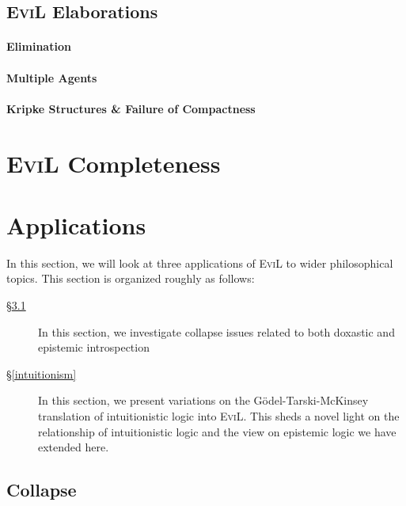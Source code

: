 \documentclass[11pt,titlepage]{report}
\numberwithin{equation}{subsection}
\renewcommand\subsection{\section}
\begin{document}
\subsection{\textsc{EviL} Elaborations}
\label{dead-by-dawn}
\subsubsection{Elimination}
\label{elimination}

\subsubsection{Multiple Agents}\label{multi-agent}

\subsubsection{Kripke Structures \& Failure of Compactness}
\label{kripke} 
\label{non-compactness}

\chapter{\textsc{EviL} Completeness}\label{army-of-darkness}


\chapter{Applications}\label{applications}
In this section, we will look at three applications of \textsc{EviL}
to wider philosophical topics.  This section is organized roughly as
follows:

\begin{description}
\item[\S\ref{collapse}] In this section, we investigate collapse issues
  related to both doxastic and  epistemic introspection 
\item[\S\ref{intuitionism}]  In this section, we present variations on
  the G\"{o}del-Tarski-McKinsey translation of intuitionistic logic
  into \textsc{EviL}.  This sheds a novel light on the relationship of
  intuitionistic logic and the view on epistemic logic we have
  extended here.
\end{description}

\subsection{Collapse}\label{collapse}

\end{document}
